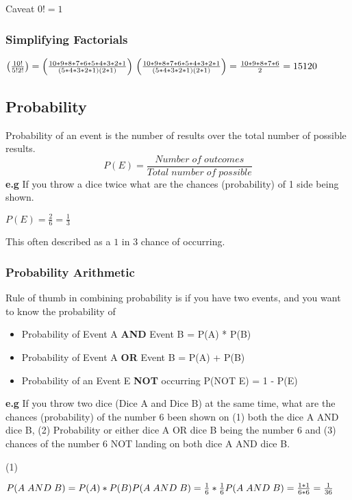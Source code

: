 \documentclass{article}
\begin{document}
Caveat $0! = 1 $

\subsubsection{Simplifying Factorials}
$\left(\frac{10!}{5!2!}\right) = \left(\frac{10 * 9 * 8 * 7 * 6 * 5 * 4 * 3 * 2 * 1}{(5 * 4 * 3 * 2 * 1)(2 * 1)}\right)\\
\left(\frac{10 * 9 * 8 * 7 * 6 * 5 * 4 * 3 * 2 * 1}{(5 * 4 * 3 * 2 * 1)(2 * 1)}\right) = \frac{10 * 9 * 8 * 7 * 6 }{2} = 15120\\
$

\newpage
\subsection{Probability}
Probability of an event is the number of results over the total number of possible results.
\begin{equation}
P(E) = \frac{Number\;of\;outcomes}{Total\;number\;of\;possible}
\end{equation}
\textbf{e.g}
If you throw a dice twice what are the chances (probability) of 1 side being shown.

$P(E) = \frac{2}{6} = \frac{1}{3}$

This often described as a $1$ in $3$ chance of occurring.

\subsubsection{Probability Arithmetic}
Rule of thumb in combining probability is if you have two events, and you want to know the probability of 
\begin{itemize}
\item Probability of Event A \textbf{AND} Event B =  P(A) * P(B)
\item Probability of Event A \textbf{OR} Event B =  P(A) + P(B)
\item Probability of an Event E \textbf{NOT} occurring P(NOT E) = 1 - P(E)
\end{itemize}

\textbf{e.g}
If you throw two dice (Dice A and Dice B) at the same time, what are the chances (probability) of the number 6 been shown on (1) both the dice A AND dice B, (2) Probability or either dice A OR dice B being the number 6 and (3) chances of the number 6 NOT landing on both dice A AND dice B.

(1)

$\\P(A\;AND\;B) = P(A) * P(B) \\
P(A\;AND\;B) = \frac{1}{6} * \frac{1}{6} \\
P(A\;AND\;B) = \frac{1 * 1}{6 * 6} = \frac{1}{36}
\\$
\end{document}
